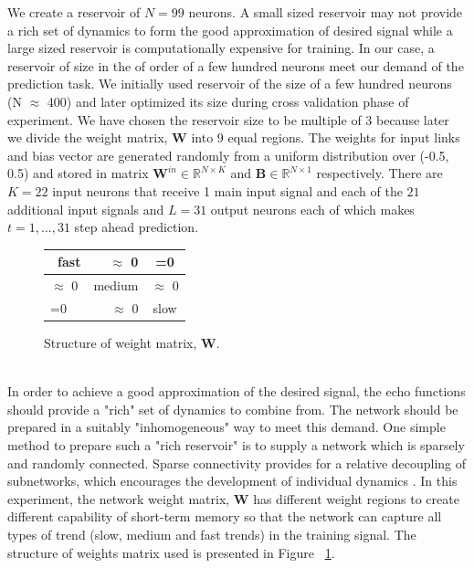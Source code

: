 	We create a reservoir of $N = 99$ neurons. A small sized reservoir may not provide a rich set of dynamics to form the good approximation of desired signal while a large sized reservoir is computationally expensive for training. In our case, a reservoir of size in the of order of a few hundred neurons meet our demand of the prediction task. We initially used reservoir of the size of a few hundred neurons (N $\approx$ 400) and later optimized its size during cross validation phase of experiment. We have chosen the reservoir size to be multiple of 3 because later we divide the weight matrix, $\mathbf{W}$ into 9 equal regions.   %
	   The weights  for input links  
	 and bias vector 
	 are generated randomly from a uniform distribution over (-0.5, 0.5) and stored in matrix $\mathbf{W}^{in} \in \mathbb{R}^{N\times K}$  and $\mathbf{B} \in \mathbb{R}^{N\times 1}$ respectively. There are $K=22$ input neurons that receive 1 main input signal and each of the $21$ additional input signals and $L=31$ output neurons each of which makes $t=1,\hdots,31$ step ahead prediction.
\\
     \begin{figure}  	  
   	 
	  \begin{center}
	  \begin{tabular}{|l|r|c|}\hline
		  \
		  fast & $\approx$ 0 & =0 \\[5ex] \hline
		  $\approx$ 0 & medium & $\approx$ 0 \\[5ex] \hline
		  =0 & $\approx$ 0 & slow \\[5ex] \hline 
	  \end{tabular}	  
	  \end{center}
		\caption{Structure of weight matrix, $\mathbf{W}$.}
		 \label{fig:wmat}
	  \end{figure}
	  \\
In order to achieve a good approximation of the desired signal, the echo functions should provide a "rich" set of dynamics to combine from. The network should be prepared in a suitably "inhomogeneous" way to meet this demand. One simple method to prepare such a "rich reservoir" is to supply a network which is sparsely and randomly connected. Sparse connectivity provides for a relative decoupling of subnetworks, which encourages the development of individual dynamics \cite{shortTermMemory}. In this experiment, the network weight matrix, $\mathbf{W}$ has different weight regions to create different capability of short-term memory so that the network can capture all types of trend (slow, medium and fast trends) in the training signal. The structure of weights matrix used is presented in Figure ~\ref{fig:wmat}.\\

